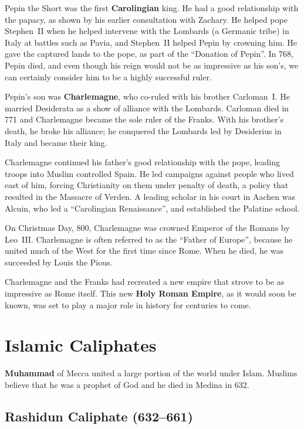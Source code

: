 Pepin the Short was the first \textbf{Carolingian} king.
He had a good relationship with the papacy, as shown by his earlier consultation with Zachary.
He helped pope Stephen~II when he helped intervene with the Lombards (a Germanic tribe)
in Italy at battles such as Pavia, and Stephen~II helped Pepin by crowning him.
He gave the captured lands to the pope, as part of the ``Donation of Pepin''.
In 768, Pepin died, and even though his reign would not be as impressive as his son's,
we can certainly consider him to be a highly successful ruler.

Pepin's son was \textbf{Charlemagne}, who co-ruled with his brother Carloman~I.
He married Desiderata as a show of alliance with the Lombards.
Carloman died in 771 and Charlemagne became the sole ruler of the Franks.
With his brother's death, he broke his alliance;
he conquered the Lombards led by Desiderius in Italy and became their king.

Charlemagne continued his father's good relationship with the pope, leading troops into Muslim controlled Spain.
He led campaigns against people who lived east of him, forcing Christianity on them under penalty of death,
a policy that resulted in the Massacre of Verden.
A leading scholar in his court in Aachen was Alcuin,
who led a ``Carolingian Renaissance'', and established the Palatine school.

On Christmas Day, 800, Charlemagne was crowned Emperor of the Romans by Leo~III\@.
Charlemagne is often referred to as the ``Father of Europe'',
because he united much of the West for the first time since Rome.
When he died, he was succeeded by Louis the Pious.

Charlemagne and the Franks had recreated a new empire that strove to be as impressive as Rome itself.
This new \textbf{Holy Roman Empire}, as it would soon be known,
was set to play a major role in history for centuries to come.

\section{Islamic Caliphates}

\textbf{Muhammad} of Mecca united a large portion of the world under Islam.
Muslims believe that he was a prophet of God and he died in Medina in 632.

\subsection*{Rashidun Caliphate (632--661)}

